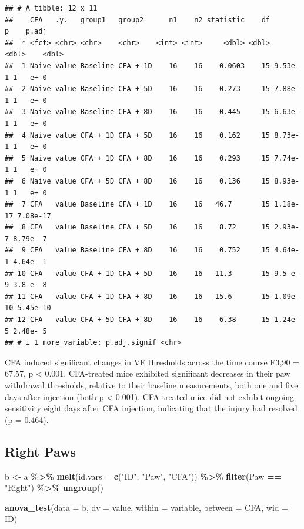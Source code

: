 \documentclass[
]{book}
\newenvironment{Shaded}{\begin{snugshade}}{\end{snugshade}}
\newcommand{\AttributeTok}[1]{\textcolor[rgb]{0.13,0.29,0.53}{#1}}
\newcommand{\FunctionTok}[1]{\textcolor[rgb]{0.13,0.29,0.53}{\textbf{#1}}}
\newcommand{\NormalTok}[1]{#1}
\newcommand{\OtherTok}[1]{\textcolor[rgb]{0.56,0.35,0.01}{#1}}
\newcommand{\SpecialCharTok}[1]{\textcolor[rgb]{0.81,0.36,0.00}{\textbf{#1}}}
\newcommand{\StringTok}[1]{\textcolor[rgb]{0.31,0.60,0.02}{#1}}
\begin{document}
\begin{verbatim}
## # A tibble: 12 x 11
##    CFA   .y.   group1   group2      n1    n2 statistic    df        p    p.adj
##  * <fct> <chr> <chr>    <chr>    <int> <int>     <dbl> <dbl>    <dbl>    <dbl>
##  1 Naive value Baseline CFA + 1D    16    16    0.0603    15 9.53e- 1 1   e+ 0
##  2 Naive value Baseline CFA + 5D    16    16    0.273     15 7.88e- 1 1   e+ 0
##  3 Naive value Baseline CFA + 8D    16    16    0.445     15 6.63e- 1 1   e+ 0
##  4 Naive value CFA + 1D CFA + 5D    16    16    0.162     15 8.73e- 1 1   e+ 0
##  5 Naive value CFA + 1D CFA + 8D    16    16    0.293     15 7.74e- 1 1   e+ 0
##  6 Naive value CFA + 5D CFA + 8D    16    16    0.136     15 8.93e- 1 1   e+ 0
##  7 CFA   value Baseline CFA + 1D    16    16   46.7       15 1.18e-17 7.08e-17
##  8 CFA   value Baseline CFA + 5D    16    16    8.72      15 2.93e- 7 8.79e- 7
##  9 CFA   value Baseline CFA + 8D    16    16    0.752     15 4.64e- 1 4.64e- 1
## 10 CFA   value CFA + 1D CFA + 5D    16    16  -11.3       15 9.5 e- 9 3.8 e- 8
## 11 CFA   value CFA + 1D CFA + 8D    16    16  -15.6       15 1.09e-10 5.45e-10
## 12 CFA   value CFA + 5D CFA + 8D    16    16   -6.38      15 1.24e- 5 2.48e- 5
## # i 1 more variable: p.adj.signif <chr>
\end{verbatim}

CFA induced significant changes in VF thresholds across the time course F\st{3,90} = 67.57, p \textless{} 0.001. CFA-treated mice exhibited significant decreases in their paw withdrawal thresholds, relative to their baseline measurements, both one and five days after injection (both p \textless{} 0.001). CFA-treated mice did not exhibit ongoing sensitivity eight days after CFA injection, indicating that the injury had resolved (p = 0.464).

\subsection*{Right Paws}\label{right-paws-2}

\begin{Shaded}
\begin{Highlighting}[]
\NormalTok{b }\OtherTok{\textless{}{-}}\NormalTok{ a }\SpecialCharTok{\%\textgreater{}\%}
  \FunctionTok{melt}\NormalTok{(}\AttributeTok{id.vars =} \FunctionTok{c}\NormalTok{(}\StringTok{"ID"}\NormalTok{, }\StringTok{"Paw"}\NormalTok{, }\StringTok{"CFA"}\NormalTok{)) }\SpecialCharTok{\%\textgreater{}\%}
  \FunctionTok{filter}\NormalTok{(Paw }\SpecialCharTok{==} \StringTok{"Right"}\NormalTok{) }\SpecialCharTok{\%\textgreater{}\%}
  \FunctionTok{ungroup}\NormalTok{()}

\FunctionTok{anova\_test}\NormalTok{(}\AttributeTok{data =}\NormalTok{ b, }\AttributeTok{dv =}\NormalTok{ value, }\AttributeTok{within =}\NormalTok{ variable, }\AttributeTok{between =}\NormalTok{ CFA, }\AttributeTok{wid =}\NormalTok{ ID)}
\end{Highlighting}
\end{Shaded}
\end{document}
